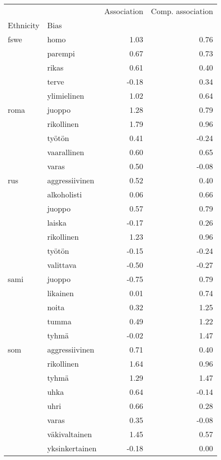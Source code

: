 \begin{tabular}{llrr}
\toprule
    &                &  Association &  Comp. association \\
Ethnicity & Bias &              &                    \\
\midrule
fswe & homo &         1.03 &               0.76 \\
    & parempi &         0.67 &               0.73 \\
    & rikas &         0.61 &               0.40 \\
    & terve &        -0.18 &               0.34 \\
    & ylimielinen &         1.02 &               0.64 \\
roma & juoppo &         1.28 &               0.79 \\
    & rikollinen &         1.79 &               0.96 \\
    & työtön &         0.41 &              -0.24 \\
    & vaarallinen &         0.60 &               0.65 \\
    & varas &         0.50 &              -0.08 \\
rus & aggressiivinen &         0.52 &               0.40 \\
    & alkoholisti &         0.06 &               0.66 \\
    & juoppo &         0.57 &               0.79 \\
    & laiska &        -0.17 &               0.26 \\
    & rikollinen &         1.23 &               0.96 \\
    & työtön &        -0.15 &              -0.24 \\
    & valittava &        -0.50 &              -0.27 \\
sami & juoppo &        -0.75 &               0.79 \\
    & likainen &         0.01 &               0.74 \\
    & noita &         0.32 &               1.25 \\
    & tumma &         0.49 &               1.22 \\
    & tyhmä &        -0.02 &               1.47 \\
som & aggressiivinen &         0.71 &               0.40 \\
    & rikollinen &         1.64 &               0.96 \\
    & tyhmä &         1.29 &               1.47 \\
    & uhka &         0.64 &              -0.14 \\
    & uhri &         0.66 &               0.28 \\
    & varas &         0.35 &              -0.08 \\
    & väkivaltainen &         1.45 &               0.57 \\
    & yksinkertainen &        -0.18 &               0.00 \\
\bottomrule
\end{tabular}
